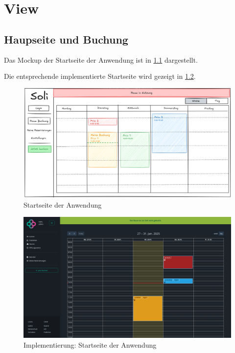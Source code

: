 
\chapter{View}
\label{chap:view}


\section{Haupseite und Buchung}

Das Mockup der Startseite der Anwendung ist in \ref{fig:startseite} dargestellt.

Die entsprechende implementierte Startseite wird gezeigt in \ref{fig:impl-startseite}.

\begin{figure}[ht]
    \centering
    \includegraphics[width=\textwidth]{figures/mockup/calendar}
    \caption{Startseite der Anwendung}
    \label{fig:startseite}
\end{figure}
\pagebreak

\begin{figure}[ht]
    \centering
    \includegraphics[width=\textwidth]{figures/impl-views/calendar}
    \caption{Implementierung: Startseite der Anwendung}
    \label{fig:impl-startseite}
\end{figure}
\pagebreak

